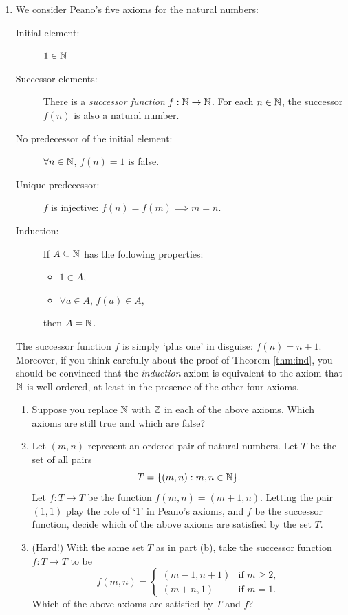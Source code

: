 \begin{exercises}{}{}
\begin{enumerate}
  \item We consider Peano's five axioms for the natural numbers:
	\begin{description}
		\item[Initial element:]\quad $1\in\mathbb{N}$
		\item[Successor elements:]\quad There is a \emph{successor function} $f:\mathbb{N}\to\mathbb{N}$. For each $n\in\mathbb{N}$, the successor $f(n)$ is also a natural number.
		\item[No predecessor of the initial element:]\quad $\forall n\in\mathbb{N}$, $f(n)=1$ is false.
		\item[Unique predecessor:]\quad $f$ is injective: $f(n)=f(m)\implies m=n$.
		\item[Induction:]\quad If $A\subseteq\mathbb{N}$ has the following properties:
		\begin{itemize}
			\item $1\in A$,
			\item $\forall a\in A$, $f(a)\in A$,
		\end{itemize}
		then $A=\mathbb{N}$.
	\end{description}
	The successor function $f$ is simply `plus one' in disguise: $f(n)=n+1$. Moreover, if you think carefully about the proof of Theorem \ref{thm:ind}, you should be convinced that the \emph{induction} axiom is equivalent to the axiom that $\mathbb{N}$ is well-ordered, at least in the presence of the other four axioms.
	\begin{enumerate}
		\item Suppose you replace $\mathbb{N}$ with $\mathbb{Z}$ in each of the above axioms. Which axioms are still true and which are false?
		\item Let $(m,n)$ represent an ordered pair of natural numbers. Let $T$ be the set of all pairs
		\[T=\{(m,n):m,n\in\mathbb{N}\}.\]
		Let $f:T\to T$ be the function $f(m,n)=(m+1,n)$. Letting the pair $(1,1)$ play the role of `1' in Peano's axioms, and $f$ be the successor function, decide which of the above axioms are satisfied by the set $T$.
		\item (Hard!) With the same set $T$ as in part (b), take the successor function $f:T\to T$ to be
		\[f(m,n)=\begin{cases}
		(m-1,n+1)&\text{if }m\ge 2,\\
		(m+n,1)&\text{if }m=1.
		\end{cases}\]
		Which of the above axioms are satisfied by $T$ and $f$?
	\end{enumerate}
	

\end{enumerate}
\end{exercises}
